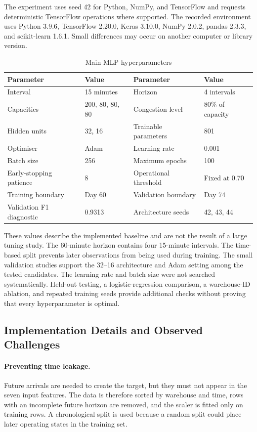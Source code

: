 \documentclass[10pt]{article}
\begin{document}
The experiment uses seed 42 for Python, NumPy, and TensorFlow and requests deterministic TensorFlow operations where supported. The recorded environment uses Python 3.9.6, TensorFlow 2.20.0, Keras 3.10.0, NumPy 2.0.2, pandas 2.3.3, and scikit-learn 1.6.1. Small differences may occur on another computer or library version.

\begin{table}[H]
\centering
\caption{Main MLP hyperparameters}
\label{tab:hyperparameters}
\small
\begin{tabular}{ll@{\qquad}ll}
\toprule
Parameter & Value & Parameter & Value \\
\midrule
Interval & 15 minutes & Horizon & 4 intervals \\
Capacities & 200, 80, 80, 80 & Congestion level & 80\% of capacity \\
Hidden units & 32, 16 & Trainable parameters & 801 \\
Optimiser & Adam & Learning rate & 0.001 \\
Batch size & 256 & Maximum epochs & 100 \\
Early-stopping patience & 8 & Operational threshold & Fixed at 0.70 \\
Training boundary & Day 60 & Validation boundary & Day 74 \\
Validation F1 diagnostic & 0.9313 & Architecture seeds & 42, 43, 44 \\
\bottomrule
\end{tabular}
\end{table}

These values describe the implemented baseline and are not the result of a large tuning study. The 60-minute horizon contains four 15-minute intervals. The time-based split prevents later observations from being used during training. The small validation studies support the 32--16 architecture and Adam setting among the tested candidates. The learning rate and batch size were not searched systematically. Held-out testing, a logistic-regression comparison, a warehouse-ID ablation, and repeated training seeds provide additional checks without proving that every hyperparameter is optimal.

\subsection{Implementation Details and Observed Challenges}

\paragraph{Preventing time leakage.}
Future arrivals are needed to create the target, but they must not appear in the seven input features. The data is therefore sorted by warehouse and time, rows with an incomplete future horizon are removed, and the scaler is fitted only on training rows. A chronological split is used because a random split could place later operating states in the training set.
\end{document}
